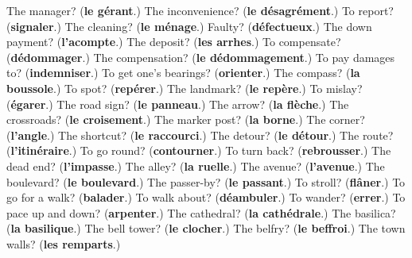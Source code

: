 \begin{tcolorbox}[breakable,colback=teal!4,colframe=teal!35!black,title={Before you move on}]
The manager? (\textbf{le gérant}.) The inconvenience? (\textbf{le désagrément}.) To report? (\textbf{signaler}.) The cleaning? (\textbf{le ménage}.) Faulty? (\textbf{défectueux}.) The down payment? (\textbf{l'acompte}.) The deposit? (\textbf{les arrhes}.) To compensate? (\textbf{dédommager}.) The compensation? (\textbf{le dédommagement}.) To pay damages to? (\textbf{indemniser}.) To get one’s bearings? (\textbf{orienter}.) The compass? (\textbf{la boussole}.) To spot? (\textbf{repérer}.) The landmark? (\textbf{le repère}.) To mislay? (\textbf{égarer}.) The road sign? (\textbf{le panneau}.) The arrow? (\textbf{la flèche}.) The crossroads? (\textbf{le croisement}.) The marker post? (\textbf{la borne}.) The corner? (\textbf{l'angle}.) The shortcut? (\textbf{le raccourci}.) The detour? (\textbf{le détour}.) The route? (\textbf{l'itinéraire}.) To go round? (\textbf{contourner}.) To turn back? (\textbf{rebrousser}.) The dead end? (\textbf{l'impasse}.) The alley? (\textbf{la ruelle}.) The avenue? (\textbf{l'avenue}.) The boulevard? (\textbf{le boulevard}.) The passer-by? (\textbf{le passant}.) To stroll? (\textbf{flâner}.) To go for a walk? (\textbf{balader}.) To walk about? (\textbf{déambuler}.) To wander? (\textbf{errer}.) To pace up and down? (\textbf{arpenter}.) The cathedral? (\textbf{la cathédrale}.) The basilica? (\textbf{la basilique}.) The bell tower? (\textbf{le clocher}.) The belfry? (\textbf{le beffroi}.) The town walls? (\textbf{les remparts}.)
\end{tcolorbox}
